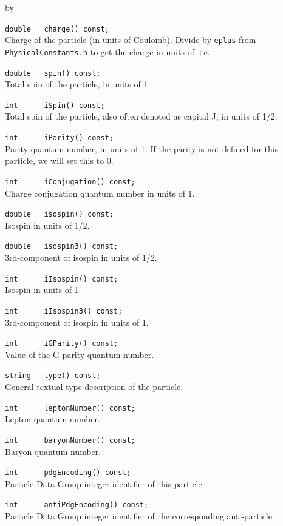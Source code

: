 \documentclass[twoside]{article}
\newcommand{\comp}[1]{\texttt{#1}}%
\newcommand{\entrylabel}[1]{\mbox{\textbf{{#1}}}\hfil}%
\newenvironment{entry}
{\begin{list}{}%
    {\renewcommand{\makelabel}{\entrylabel}%
     \setlength{\labelwidth}{90pt}%
     \setlength{\leftmargin}{\labelwidth}
     \advance\leftmargin by \labelsep%
      }%
    }%
  {\end{list}}
\newcommand{\Entrylabel}[1]%
{\raisebox{0pt}[1ex][0pt]{\makebox[\labelwidth][l]%
    {\parbox[t]{\labelwidth}{\hspace{0pt}\textbf{{#1}}}}}}
\newenvironment{Entry}%
{\renewcommand{\entrylabel}{\Entrylabel}\begin{entry}}%
  {\end{entry}}
\begin{document}
\begin{description}
\begin{Entry}
    \verb+double   charge() const;+\\
    Charge of the particle (in units of Coulomb). Divide by \comp{eplus}
    from \comp{PhysicalConstants.h} to get the charge in units of +e.
    
    \verb+double   spin() const;+\\
    Total spin of the particle, in units of 1.
    
    \verb+int      iSpin() const;+\\
    Total spin of the particle, also often denoted as
    capital J, in units of 1/2.
    
    \verb+int      iParity() const;+\\ 
    Parity quantum number, in units of 1.
    If the parity is not defined for this particle,
    we will set this to 0.
    
    \verb+int      iConjugation() const;+\\
    Charge conjugation quantum number in units of 1.
    
    \verb+double   isospin() const;+\\
    Isospin in units of 1/2.
    
    \verb+double   isospin3() const;+\\ 
    3rd-component of isospin in units of 1/2.
    
    \verb+int      iIsospin() const;+\\
    Isospin in units of 1.
    
    \verb+int      iIsospin3() const;+\\ 
    3rd-component of isospin in units of 1.
    
    \verb+int      iGParity() const;+\\
    Value of the G-parity quantum number.
    
    \verb+string   type() const;+\\
    General textual type description of the particle.
    
    \verb+int      leptonNumber() const;+\\
    Lepton quantum number.
    
    \verb+int      baryonNumber() const;+\\
    Baryon quantum number.
    
    \verb+int      pdgEncoding() const;+\\
    Particle Data Group integer identifier of this particle

    \verb+int      antiPdgEncoding() const;+\\
    Particle Data Group integer identifier of the corresponding
    anti-particle.
    

\end{Entry}
\end{description}
\end{document}
